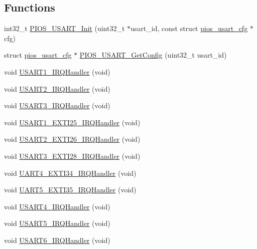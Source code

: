 \subsection*{\-Functions}
\begin{DoxyCompactItemize}
\item 
int32\-\_\-t \hyperlink{group___p_i_o_s___u_s_a_r_t_ga437fb84f2fc14d2db87aea8b53a0a73c}{\-P\-I\-O\-S\-\_\-\-U\-S\-A\-R\-T\-\_\-\-Init} (uint32\-\_\-t $\ast$usart\-\_\-id, const struct \hyperlink{structpios__usart__cfg}{pios\-\_\-usart\-\_\-cfg} $\ast$cfg)
\item 
struct \hyperlink{structpios__usart__cfg}{pios\-\_\-usart\-\_\-cfg} $\ast$ \hyperlink{group___p_i_o_s___u_s_a_r_t_ga950365bc3d27bf7c436e8e549128a1ad}{\-P\-I\-O\-S\-\_\-\-U\-S\-A\-R\-T\-\_\-\-Get\-Config} (uint32\-\_\-t usart\-\_\-id)
\item 
void \hyperlink{group___p_i_o_s___u_s_a_r_t_ga7139cd4baabbbcbab0c1fe6d7d4ae1cc}{\-U\-S\-A\-R\-T1\-\_\-\-I\-R\-Q\-Handler} (void)
\item 
void \hyperlink{group___p_i_o_s___u_s_a_r_t_ga0ca6fd0e6f77921dd1123539857ba0a8}{\-U\-S\-A\-R\-T2\-\_\-\-I\-R\-Q\-Handler} (void)
\item 
void \hyperlink{group___p_i_o_s___u_s_a_r_t_ga0d108a3468b2051548183ee5ca2158a0}{\-U\-S\-A\-R\-T3\-\_\-\-I\-R\-Q\-Handler} (void)
\item 
void \hyperlink{group___p_i_o_s___u_s_a_r_t_ga9da740f6a7dda252db44255f54a3bee3}{\-U\-S\-A\-R\-T1\-\_\-\-E\-X\-T\-I25\-\_\-\-I\-R\-Q\-Handler} (void)
\item 
void \hyperlink{group___p_i_o_s___u_s_a_r_t_ga4897c2dbb8e8ae70938922276f95800b}{\-U\-S\-A\-R\-T2\-\_\-\-E\-X\-T\-I26\-\_\-\-I\-R\-Q\-Handler} (void)
\item 
void \hyperlink{group___p_i_o_s___u_s_a_r_t_gaab980dd8a502127dc3ae895e77931bdd}{\-U\-S\-A\-R\-T3\-\_\-\-E\-X\-T\-I28\-\_\-\-I\-R\-Q\-Handler} (void)
\item 
void \hyperlink{group___p_i_o_s___u_s_a_r_t_ga552c5d505ae108eef11cd39ebc22773b}{\-U\-A\-R\-T4\-\_\-\-E\-X\-T\-I34\-\_\-\-I\-R\-Q\-Handler} (void)
\item 
void \hyperlink{group___p_i_o_s___u_s_a_r_t_ga379570b068a7a67525c68b24831f77fd}{\-U\-A\-R\-T5\-\_\-\-E\-X\-T\-I35\-\_\-\-I\-R\-Q\-Handler} (void)
\item 
void \hyperlink{group___p_i_o_s___u_s_a_r_t_gad0d53420fd047695ef9cf3fda8282d9b}{\-U\-S\-A\-R\-T4\-\_\-\-I\-R\-Q\-Handler} (void)
\item 
void \hyperlink{group___p_i_o_s___u_s_a_r_t_gaea1a468c29d1d6aba1bba3f58c4b3b7e}{\-U\-S\-A\-R\-T5\-\_\-\-I\-R\-Q\-Handler} (void)
\item 
void \hyperlink{group___p_i_o_s___u_s_a_r_t_ga12c827857d907ad0cccd586fd934d446}{\-U\-S\-A\-R\-T6\-\_\-\-I\-R\-Q\-Handler} (void)
\end{DoxyCompactItemize}
